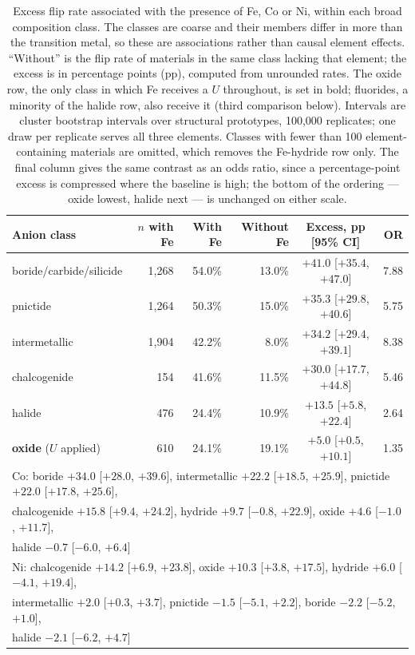 \documentclass[11pt]{article}
\begin{document}
\begin{table}[htbp]\centering
\caption{Excess flip rate associated with the presence of Fe, Co or Ni, within each broad
composition class. The classes are coarse and their members differ in more than the
transition metal, so these are associations rather than causal element effects.
``Without'' is the flip rate of materials in the same class lacking that element; the
excess is in percentage points (pp), computed from unrounded rates. The oxide row, the
only class in which Fe receives a $U$ throughout, is set in bold; fluorides, a minority of
the halide row, also receive it (third comparison below). Intervals are cluster bootstrap
intervals over structural prototypes, 100{,}000
replicates; one draw per replicate serves all three elements. Classes with fewer than 100
element-containing materials are omitted, which removes the Fe-hydride row only. The final
column gives the same contrast as an odds ratio, since a percentage-point excess is
compressed where the baseline is high; the bottom of the ordering --- oxide lowest,
halide next --- is unchanged on either scale.}
\label{tab:feexcess}
\small\begin{tabular}{lrrrcr}
\toprule
Anion class & $n$ with Fe & With Fe & Without Fe & Excess, pp [95\% CI] & OR \\
\midrule
boride/carbide/silicide & 1{,}268 & 54.0\% & 13.0\% & $+41.0$ [$+35.4$, $+47.0$] & 7.88 \\
pnictide                & 1{,}264 & 50.3\% & 15.0\% & $+35.3$ [$+29.8$, $+40.6$] & 5.75 \\
intermetallic           & 1{,}904 & 42.2\% & \phantom{0}8.0\% & $+34.2$ [$+29.4$, $+39.1$] & 8.38 \\
chalcogenide            & \phantom{0}154 & 41.6\% & 11.5\% & $+30.0$ [$+17.7$, $+44.8$] & 5.46 \\
halide                  & \phantom{0}476 & 24.4\% & 10.9\% & $+13.5$ [$+5.8$, $+22.4$] & 2.64 \\
\textbf{oxide} ($U$ applied) & \phantom{0}610 & 24.1\% & 19.1\% & $\mathbf{+5.0}$ [$+0.5$, $+10.1$] & 1.35 \\
\midrule
\multicolumn{6}{l}{Co: boride $+34.0$ [$+28.0$, $+39.6$], intermetallic $+22.2$ [$+18.5$, $+25.9$], pnictide $+22.0$ [$+17.8$, $+25.6$],} \\
\multicolumn{6}{l}{\phantom{Co: }chalcogenide $+15.8$ [$+9.4$, $+24.2$], hydride $+9.7$ [$-0.8$, $+22.9$], oxide $+4.6$ [$-1.0$, $+11.7$],} \\
\multicolumn{6}{l}{\phantom{Co: }halide $-0.7$ [$-6.0$, $+6.4$]} \\
\multicolumn{6}{l}{Ni: chalcogenide $+14.2$ [$+6.9$, $+23.8$], oxide $+10.3$ [$+3.8$, $+17.5$], hydride $+6.0$ [$-4.1$, $+19.4$],} \\
\multicolumn{6}{l}{\phantom{Ni: }intermetallic $+2.0$ [$+0.3$, $+3.7$], pnictide $-1.5$ [$-5.1$, $+2.2$], boride $-2.2$ [$-5.2$, $+1.0$],} \\
\multicolumn{6}{l}{\phantom{Ni: }halide $-2.1$ [$-6.2$, $+4.7$]} \\
\bottomrule
\end{tabular}
\end{table}
\end{document}
